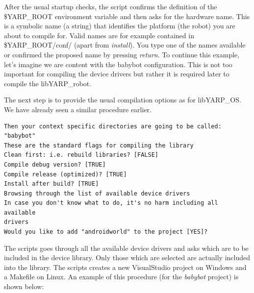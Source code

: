 After the usual startup checks, the script confirms the definition of the \$YARP\_ROOT environment variable and then asks for the hardware name. This is a symbolic name (a string) that identifies the platform (the robot) you are about to compile for. Valid names are for example contained in \$YARP\_ROOT/conf/ (apart from {\em install}). You type one of the names available or confirmed the proposed name by pressing {\em return}. To continue this example, let's imagine we are content with the babybot configuration. This is not too important for compiling the device drivers but rather it is required later to compile the libYARP\_robot.

The next step is to provide the usual compilation options as for libYARP\_OS. We have already seen a similar procedure earlier.

\begin{verbatim}
Then your context specific directories are going to be called: "babybot"
These are the standard flags for compiling the library
Clean first: i.e. rebuild libraries? [FALSE]
Compile debug version? [TRUE]
Compile release (optimized)? [TRUE]
Install after build? [TRUE]
Browsing through the list of available device drivers
In case you don't know what to do, it's no harm including all available 
drivers
Would you like to add "androidworld" to the project [YES]?
\end{verbatim}

The scripts goes through all the available device drivers and asks which are to be included in the device library. Only those which are selected are actually included into the library. The scripts creates a new VisualStudio project on Windows and a Makefile on Linux. An example of this procedure (for the {\em babybot} project) is shown below:

